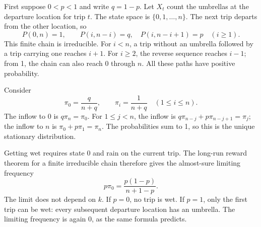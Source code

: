 First suppose $0<p<1$ and write $q=1-p$. Let $X_t$ count the umbrellas at the departure location for trip $t$. The state space is $\{0,1,\ldots,n\}$. The next trip departs from the other location, so
\[
 P(0,n)=1,\qquad
 P(i,n-i)=q,\quad P(i,n-i+1)=p\quad(i\ge1).
\]
This finite chain is irreducible. For $i<n$, a trip without an umbrella followed by a trip carrying one reaches $i+1$. For $i\ge2$, the reverse sequence reaches $i-1$; from 1, the chain can also reach 0 through $n$. All these paths have positive probability.

Consider
\[
 \pi_0=\frac q{n+q},\qquad
 \pi_i=\frac1{n+q}\quad(1\le i\le n).
\]
The inflow to 0 is $q\pi_n=\pi_0$. For $1\le j<n$, the inflow is $q\pi_{n-j}+p\pi_{n-j+1}=\pi_j$; the inflow to $n$ is $\pi_0+p\pi_1=\pi_n$. The probabilities sum to 1, so this is the unique stationary distribution.

Getting wet requires state 0 and rain on the current trip. The long-run reward theorem for a finite irreducible chain therefore gives the almost-sure limiting frequency
\[
 \boxed{p\pi_0=\frac{p(1-p)}{n+1-p}}.
\]
The limit does not depend on $k$. If $p=0$, no trip is wet. If $p=1$, only the first trip can be wet: every subsequent departure location has an umbrella. The limiting frequency is again 0, as the same formula predicts.

